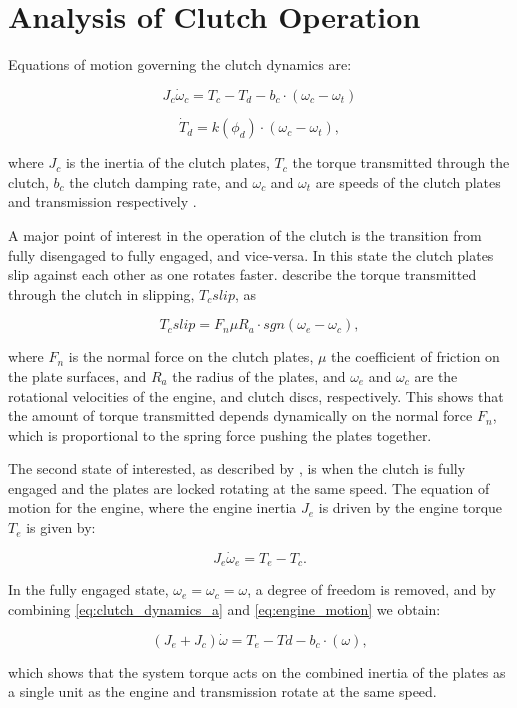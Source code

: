 
\chapter{Analysis of Clutch Operation\label{cha:clutch_analysis}}

Equations of motion governing the clutch dynamics are:

\begin{equation}\label{eq:clutch_dynamics_a}
  J_c\dot{\omega}_c=T_c-T_d-b_c\cdot\left(\omega_c-\omega_t\right)
\end{equation}

\begin{equation}\label{eq:clutch_dynamics_b}
  \dot{T}_d=k\left(\phi_d\right)\cdot\left(\omega_c-\omega_t\right),
\end{equation}

where $J_c$ is the inertia of the clutch plates, $T_c$ the torque transmitted through the clutch, $b_c$ the clutch damping rate, and $\omega_c$ and $\omega_t$ are speeds of the clutch plates and transmission respectively \cite{clutch_control}.

A major point of interest in the operation of the clutch is the transition from fully disengaged to fully engaged, and vice-versa. In this state the clutch plates slip against each other as one rotates faster.  describe the torque transmitted through the clutch in slipping, $T_c{slip}$, as

\begin{equation}\label{eq:clutch_slip}
  T_c{slip}=F_n\mu R_a \cdot sgn\left(\omega_e-\omega_c\right),
\end{equation}

where $F_n$ is the normal force on the clutch plates, $\mu$ the coefficient of friction on the plate surfaces, and $R_a$ the radius of the plates, and $\omega_e$ and $\omega_c$ are the rotational velocities of the engine, and clutch discs, respectively. This shows that the amount of torque transmitted depends dynamically on the normal force $F_n$, which is proportional to the spring force pushing the plates together.

The second state of interested, as described by \cite{clutch_control}, is when the clutch is fully engaged and the plates are locked rotating at the same speed. The equation of motion for the engine, where the engine inertia $J_e$ is driven by the engine torque $T_e$ is given by:

\begin{equation}\label{eq:engine_motion}
  J_e\dot{\omega}_e=T_e-T_c.
\end{equation}

In the fully engaged state, $\omega_e=\omega_c=\omega$, a degree of freedom is removed, and by combining \eqref{eq:clutch_dynamics_a} and \eqref{eq:engine_motion} we obtain:

\begin{equation}
  \left(J_e+J_c\right)\dot{\omega}=T_e-Td-b_c\cdot\left(\omega\right),
\end{equation}

which shows that the system torque acts on the combined inertia of the plates as a single unit as the engine and transmission rotate at the same speed.
